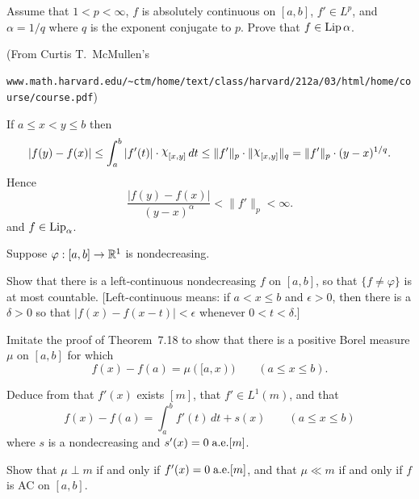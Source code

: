 \begin{enumerate}
\begin{excopy}
Assume that \(1<p<\infty\), $f$ is absolutely continuous on \([a,b]\),
\(f'\in L^p\), and \(\alpha = 1/q\) where $q$ is the exponent conjugate to $p$.
Prove that \(f\in \mathop{\rm Lip}\nolimits\alpha\).
\end{excopy}

{\small (From Curtis T.~McMullen's\\
\texttt{\scriptsize
www.math.harvard.edu/{\~{}}ctm/home/text/class/harvard/212a/03/html/home/course/course.pdf})}

If \(a\leq x<y\leq b\) then
\begin{equation*}
|f(y)-f(x)| 
\leq \int_a^b |f'(t)| \cdot \chhi_{[x,y]}\,dt
\leq \|f'\|_p \cdot \|\chhi_{[x,y]}\|_q 
=    \|f'\|_p \cdot(y-x)^{1/q}.
\end{equation*}
Hence 
\begin{equation*}
\frac{|f(y)-f(x)|}{(y-x)^\alpha} < \|f'\|_p < \infty.
\end{equation*}
and \(f\in \mathop{\rm Lip}\nolimits_\alpha\).





\begin{excopy}
Suppose 
\label{ex:7.12}
\(\varphi: [a,b]\to\mathbb{R}^1\) is nondecreasing.
\begin{itemize}

Show that there is a left-continuous nondecreasing $f$ on \([a,b]\),
so that \(\{f\neq\varphi\}\) is at most countable. 
[Left-continuous means: if \(a<x\leq b\) and \(\epsilon > 0\), then there is 
a \(\delta>0\) so that \(|f(x) - f(x-t)|<\epsilon\) whenever \(0<t<\delta\).]

Imitate the proof of Theorem~7.18 to show that there is a positive Borel measure
\(\mu\) on \([a,b]\) for which
\begin{equation*}
f(x) - f(a) = \mu([a,x)) \qquad (a\leq x \leq b).
\end{equation*}

Deduce from  that \(f'(x)\) exists \aded \([m]\), 
that \(f'\in L^1(m)\), and that
\begin{equation*}
f(x) - f(a) = \int_a^b f'(t)\,dt + s(x) \qquad (a\leq x \leq b)
\end{equation*}
where $s$ is a nondecreasing and \(s'(x)=0\;\textrm{a.e.}[m]\).

Show that \(\mu\perp m\) if and only if \(f'(x)=0\;\textrm{a.e.}[m]\),
and that \(\mu \ll m\) if and only if $f$ is AC on \([a,b]\).


\end{itemize}
\end{excopy}
\end{enumerate}
